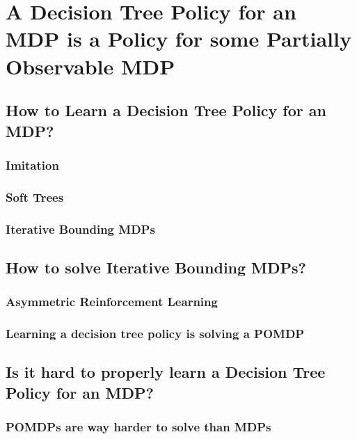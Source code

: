 \chapter{A Decision Tree Policy for an MDP is a Policy for some Partially Observable MDP}


\section{How to Learn a Decision Tree Policy for an MDP?}
\subsection{Imitation}
\subsection{Soft Trees}
\subsection{Iterative Bounding MDPs}

\section{How to solve Iterative Bounding MDPs?}
\subsection{Asymmetric Reinforcement Learning}
\subsection{Learning a decision tree policy is solving a POMDP}

\section{Is it hard to properly learn a Decision Tree Policy for an MDP?}
\subsection{POMDPs are way harder to solve than MDPs}
